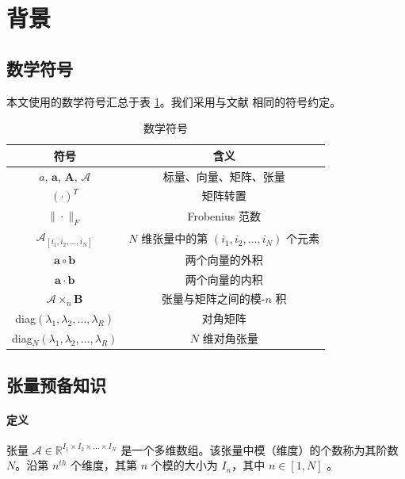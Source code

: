 
\section{背景}
\subsection{数学符号}

本文使用的数学符号汇总于表 \ref{math_notation}。我们采用与文献 \cite{cichocki2015tensor} 相同的符号约定。

\begin{table}[htbp]
\scriptsize
  \caption{数学符号}
  \label{math_notation}
  \centering
  \begin{tabular}{cc}
    \toprule
      符号   & 含义 \\
    \midrule
    $a$, $\mathbf{a}$, $\mathbf{A}$, $\mathcal{A}$    & 标量、向量、矩阵、张量  \\
    $(\cdot)^T$ & 矩阵转置 \\
    $\|\cdot\|_F$ & Frobenius 范数 \\
    $\mathcal{A}_{[i_1, i_2, \dots, i_N]}$ & $N$ 维张量中的第 $(i_1, i_2, \dots, i_N)$ 个元素 \\
    $\mathbf{a} \circ \mathbf{b}$ & 两个向量的外积 \\
    $\mathbf{a} \cdot \mathbf{b}$ & 两个向量的内积 \\
    $\mathcal{A} \times_n \mathbf{B}$ & 张量与矩阵之间的模-$n$ 积 \\
    diag$\left(\lambda_1, \lambda_2, \dots, \lambda_R \right)$ & 对角矩阵  \\
    diag$_N \left(\lambda_1, \lambda_2, \dots, \lambda_R \right)$ & $N$ 维对角张量 \\
    \bottomrule
  \end{tabular}
\end{table}


\subsection{张量预备知识}

\paragraph{定义} 张量 $\mathcal{A} \in \mathbb{R}^{I_1 \times I_2 \times \dots \times I_N}$ 是一个多维数组。该张量中模（维度）的个数称为其阶数 $N$。沿第 $n^{th}$ 个维度，其第 $n$ 个模的大小为 $I_n$，其中 $n \in [1, N]$ \cite{kolda2009tensor}。

